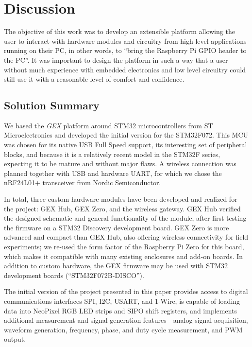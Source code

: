 \chapter{Discussion}

The objective of this work was to develop an extensible platform allowing the user to interact with hardware modules and circuitry from high-level applications running on their \gls{PC}, in other words, to ``bring the Raspberry Pi GPIO header to the \gls{PC}''. It was important to design the platform in such a way that a user without much experience with embedded electronics and low level circuitry could still use it with a reasonable level of comfort and confidence.

\section{Solution Summary}

We based the \textit{GEX} platform around STM32 microcontrollers from ST Microelectronics and developed the initial version for the STM32F072. This \gls{MCU} was chosen for its native \gls{USB} Full Speed support, its interesting set of peripheral blocks, and because it is a relatively recent model in the STM32F series, expecting it to be mature and without major flaws. A wireless connection was planned together with \gls{USB} and hardware \gls{UART}, for which we chose the nRF24L01+ transceiver from Nordic Semiconductor.

In total, three custom hardware modules have been developed and realized for the project: GEX Hub, GEX Zero, and the wireless gateway. GEX Hub verified the designed schematic and general functionality of the module, after first testing the firmware on a STM32 Discovery development board. GEX Zero is more advanced and compact than GEX Hub, also offering wireless connectivity for field experiments; we re-used the form factor of the Raspberry Pi Zero for this board, which makes it compatible with many existing enclosures and add-on boards. In addition to custom hardware, the GEX firmware may be used with STM32 development boards (``STM32F072B-DISCO'').

The initial version of the project presented in this paper provides access to digital communications interfaces \gls{SPI}, \gls{I2C}, \gls{USART}, and 1-Wire, is capable of loading data into NeoPixel RGB \gls{LED} strips and \gls{SIPO} shift registers, and implements additional measurement and signal generation features---analog signal acquisition, waveform generation, frequency, phase, and duty cycle measurement, and \gls{PWM} output.

